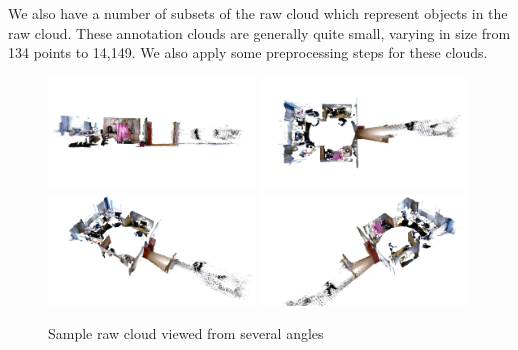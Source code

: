 \documentclass[11pt,a4paper]{kth-mag}
\begin{document}
We also have a number of subsets of the raw cloud which represent objects in the
raw cloud. These annotation clouds are generally quite small, varying in size
from 134 points to 14,149. We also apply some preprocessing steps for these
clouds.

\begin{figure}
  \centering
  \includegraphics[width=0.49\textwidth]{images/orig_side}
  \includegraphics[width=0.49\textwidth]{images/orig_top}
  \includegraphics[width=0.49\textwidth]{images/orig_diag_left}
  \includegraphics[width=0.49\textwidth]{images/orig_diag_right}
  \caption{Sample raw cloud viewed from several angles}
  \label{fig:orig}
\end{figure}
\end{document}
